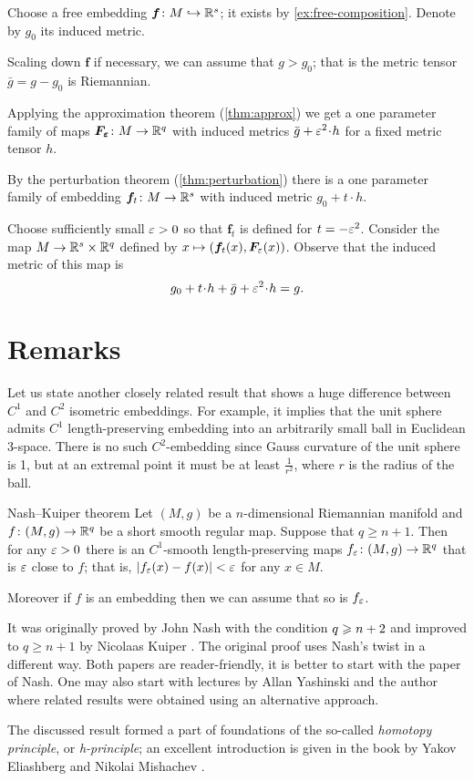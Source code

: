 Choose a free embedding $\bm{f}\colon M\hookrightarrow\mathbb{R}^s$;
it exists by \ref{ex:free-composition}.
Denote by $g_0$ its induced metric.

Scaling down $\bm{f}$ if necessary, we can assume that $g>g_0$;
that is the metric tensor $\bar g= g-g_0$ is Riemannian.

Applying the approximation theorem (\ref{thm:approx}) we get a one parameter family of maps $\bm{F_\varepsilon}\colon M\to \mathbb{R}^q$ with induced metrics $\bar g+\eps^2\cdot h$ for a fixed metric tensor $h$.

By the perturbation theorem (\ref{thm:perturbation}) there is a one parameter family of embedding $\bm{f}_t\colon M\to \mathbb{R}^s$ with induced metric $g_0+t\cdot h$.

Choose sufficiently small $\varepsilon>0$ so that $\bm{f}_t$ is defined for $t=-\varepsilon^2$.
Consider the map $M\to \mathbb{R}^s\times\mathbb{R}^q$ defined by 
$x\mapsto (\bm{f}_t(x),\bm{F}_\varepsilon(x))$.
Observe that the induced metric of this map is
\[g_0+t\cdot h+\bar g+\eps^2\cdot h=g.\]
\qedsf

\section{Remarks}

Let us state another closely related result that shows a huge difference between $C^1$ and $C^2$ isometric embeddings.
For example, it implies that the unit sphere admits $C^1$ length-preserving embedding into an arbitrarily small ball in Euclidean 3-space.
There is no such $C^2$-embedding since Gauss curvature of the unit sphere is 1, but at an extremal point it must be at least $\tfrac1{r^2}$, where $r$ is the radius of the ball.

\begin{thm}{Nash--Kuiper theorem}
Let $(M,g)$ be a $n$-dimensional Riemannian manifold and $f\colon(M,g)\to \mathbb{R}^q$ be a short smooth regular map.
Suppose that $q\ge n+1$.
Then for any $\varepsilon>0$ there is an $C^1$-smooth length-preserving maps $f_\varepsilon\colon(M,g)\to \mathbb{R}^q$ that is $\varepsilon$ close to $f$;
that is, $|f_\varepsilon(x)-f(x)|<\varepsilon$ for any $x\in M$.

Moreover if $f$ is an embedding then we can assume that so is $f_\varepsilon$.

\end{thm}


It was originally proved by John Nash \cite{nash-1954} with the condition $q\z\ge n+2$ and improved to $q\ge n+1$ by Nicolaas Kuiper \cite{kuiper-1955}.
The original proof uses Nash's twist in a different way. Both papers are reader-friendly, it is better to start with the paper of Nash.
One may also start with lectures by Allan Yashinski and the author \cite{petrunin-yashinski} where related results were obtained using an alternative approach.

The discussed result formed a part of foundations of the so-called \emph{homotopy principle}, or \emph{h-principle}; an excellent introduction is given in the book by Yakov Eliashberg and Nikolai Mishachev \cite{eliashberg-mishachev}.







